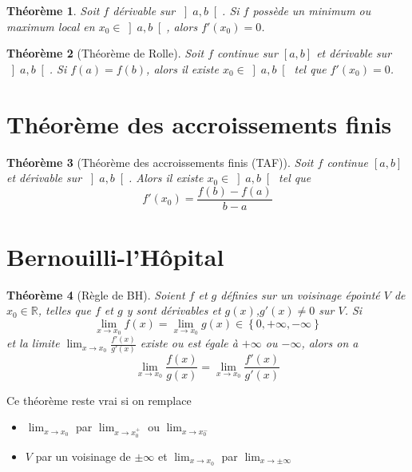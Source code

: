 \documentclass[10pt,a4paper]{book}
\newcommand{\R}{\mathbb{R}}
\newtheorem{theorem}{Théorème}[section]
\begin{document}
\begin{theorem}
Soit $f$ dérivable sur $\left]a,b\right[$. Si $f$ possède un minimum ou maximum local en $x_0 \in \left]a,b\right[$, alors $f'(x_0)=0$.
\end{theorem}


\begin{theorem}[Théorème de Rolle]
Soit $f$ continue sur $\left[a,b\right]$ et dérivable sur $\left]a,b\right[$. Si $f(a)=f(b)$, alors il existe $x_0 \in \left]a,b\right[$ tel que $f'(x_0)=0$.
\end{theorem}

\section{Théorème des accroissements finis}

\begin{theorem}[Théorème des accroissements finis (TAF)]
Soit $f$ continue $\left[a,b\right]$ et dérivable sur $\left]a,b\right[$. Alors il existe $x_0 \in \left]a,b\right[$ tel que
\[f'(x_0) = \frac{f(b)-f(a)}{b-a}\]
\end{theorem}

\section{Bernouilli-l'Hôpital}

\begin{theorem}[Règle de BH]
Soient $f$ et $g$ définies sur un voisinage épointé $V$ de $x_0 \in \R$, telles que $f$ et $g$ y sont dérivables et $g(x)$,$g'(x)\neq 0$ sur $V$. Si 
\[\lim_{x \rightarrow x_0} f(x) = \lim_{x \rightarrow x_0} g(x) \in \left\lbrace 0, +\infty, -\infty \right\rbrace\]
et la limite $\lim_{x \rightarrow x_0} \frac{f'(x)}{g'(x)}$ existe ou est égale à $+\infty$ ou $-\infty$, alors on a
\[\lim_{x \rightarrow x_0}\frac{f(x)}{g(x)} = \lim_{x \rightarrow x_0}\frac{f'(x)}{g'(x)}\]
\end{theorem}
Ce théorème reste vrai si on remplace
\begin{itemize}
\item $\lim_{x \rightarrow x_0}$ par $\lim_{x \rightarrow x_0^+}$ ou $\lim_{x \rightarrow x_0^-}$
\item $V$ par un voisinage de $\pm \infty$ et $\lim_{x \rightarrow x_0}$ par $\lim_{x \rightarrow \pm \infty}$
\end{itemize}

\end{document}
